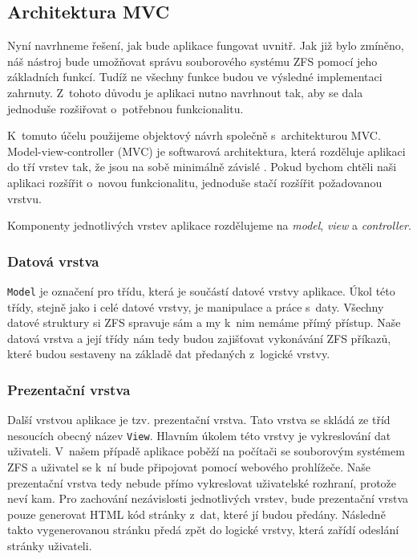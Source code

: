     \subsection{Architektura MVC}
    Nyní navrhneme řešení, jak bude aplikace fungovat uvnitř. Jak již bylo zmíněno, náš nástroj bude umožňovat správu souborového systému ZFS pomocí jeho základních funkcí. Tudíž ne všechny funkce budou ve výsledné implementaci zahrnuty. Z~tohoto důvodu je aplikaci nutno navrhnout tak, aby se dala jednoduše rozšiřovat o~potřebnou funkcionalitu.

    K~tomuto účelu použijeme objektový návrh společně s~architekturou MVC. Model-view-controller (MVC) je softwarová architektura, která rozděluje aplikaci do tří vrstev tak, že jsou na sobě minimálně závislé \cite{mvc}. Pokud bychom chtěli naši aplikaci rozšířit o~novou funkcionalitu, jednoduše stačí rozšířit požadovanou vrstvu.

    Komponenty jednotlivých vrstev aplikace rozdělujeme na \emph{model}, \emph{view} a \emph{controller}.

        \subsubsection{Datová vrstva}
        \verb|Model| je označení pro třídu, která je součástí datové vrstvy aplikace. Úkol této třídy, stejně jako i celé datové vrstvy, je manipulace a práce s~daty. Všechny datové struktury si ZFS spravuje sám a my k~nim nemáme přímý přístup. Naše datová vrstva a její třídy nám tedy budou zajišťovat vykonávání ZFS příkazů, které budou sestaveny na základě dat předaných z~logické vrstvy.
        \subsubsection{Prezentační vrstva}
        Další vrstvou aplikace je tzv. prezentační vrstva. Tato vrstva se skládá ze tříd nesoucích obecný název \verb|View|. Hlavním úkolem této vrstvy je vykreslování dat uživateli. V~našem případě aplikace poběží na počítači se souborovým systémem ZFS a uživatel se k~ní bude připojovat pomocí webového prohlížeče. Naše prezentační vrstva tedy nebude přímo vykreslovat uživatelské rozhraní, protože neví kam. Pro zachování nezávislosti jednotlivých vrstev, bude prezentační vrstva pouze generovat HTML kód stránky z~dat, které jí budou předány. Následně takto vygenerovanou stránku předá zpět do logické vrstvy, která zařídí odeslání stránky uživateli.
